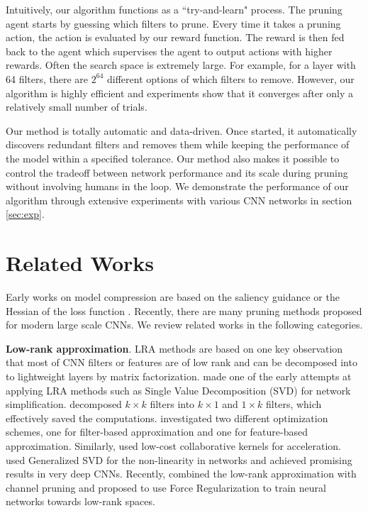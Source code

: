 \documentclass[10pt,twocolumn,letterpaper]{article}
\begin{document}
Intuitively, our algorithm functions as a ``try-and-learn" process. The pruning agent starts by guessing which filters to prune. Every time it takes a pruning action, the action is evaluated by our reward function. The reward is then fed back to the agent which supervises the agent to output actions with higher rewards. Often the search space is extremely large. For example, for a layer with 64 filters, there are $2^{64}$ different options of which filters to remove. However, our algorithm is highly efficient and experiments show that it converges after only a relatively small number of trials. 

Our method is totally automatic and data-driven. Once started, it automatically discovers redundant filters and removes them while keeping the performance of the model within a specified tolerance. Our method also makes it possible to control the tradeoff between network performance and its scale during pruning without involving humans in the loop. We demonstrate the performance of our algorithm through extensive experiments with various CNN networks in section \ref{sec:exp}.






\section{Related Works}

Early works on model compression are based on the saliency guidance \cite{optimal} or the Hessian of the loss function \cite{second}. Recently, there are many pruning methods proposed for modern large scale CNNs. We review related works in the following categories.


\textbf{Low-rank approximation}. LRA methods \cite{exploit_linear,lr_expansion} are based on one key observation that most of CNN filters or features are of low rank and can be decomposed into to lightweight layers by matrix factorization. \cite{exploit_linear} made one of the early attempts at applying LRA methods such as Single Value Decomposition (SVD) for network simplification. \cite{lr_expansion} decomposed $k \times k$ filters into $k \times 1$ and $1 \times k$ filters, which effectively saved the computations. \cite{lr_expansion} investigated two different optimization schemes, one for filter-based approximation and one for feature-based approximation. Similarly, \cite{lccl} used low-cost collaborative kernels for acceleration. \cite{zhang_accelerating} used Generalized SVD for the non-linearity in networks and achieved promising results in very deep CNNs. Recently, \cite{yihuihe} combined the low-rank approximation with channel pruning and \cite{Wen_2017_ICCV} proposed to use Force Regularization to train neural networks towards low-rank spaces.
\end{document}
